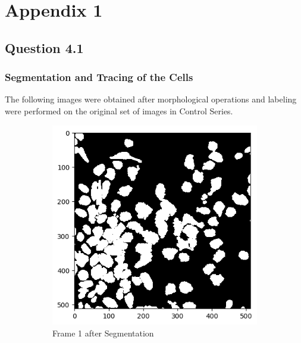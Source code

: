 \documentclass{article}
\begin{document}
\section*{Appendix 1}
\subsection*{Question 4.1}
\subsubsection*{Segmentation and Tracing of the Cells}
The following images were obtained after morphological operations and labeling were performed on the original set of images in Control Series. 
\begin{figure}[h!]
  \centering
  \begin{subfigure}{0.4\textwidth}
    \includegraphics[width=\linewidth]{Report/Appendix_Images/Segmentation-A-Control/frame_1.png}
    \caption*{Frame 1 after Segmentation}
  \end{subfigure}
  \hfill
  \begin{subfigure}{0.4\textwidth}

\end{subfigure}
\end{figure}
\end{document}
